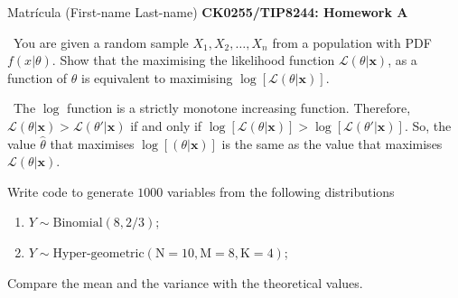 \documentclass[11pt]{article}
\newenvironment{EX}[2][Exercise]{\begin{trivlist}
\item[{\color{red} \hskip \labelsep {\bfseries #1}\hskip \labelsep {\bfseries #2.}}]}{\end{trivlist}}
\newenvironment{SL}[1][Solution]{\begin{trivlist}
\item[{\color{blue} \hskip \labelsep {\bfseries #1:}}]}{\end{trivlist}}
\begin{document}

\noindent Matr\'icula (First-name Last-name) \hfill {\Large \bfseries CK0255/TIP8244: Homework A} \\

\begin{EX}{A.1}\
You are given a random sample $X_1,X_2,\dots,X_n$ from a population with PDF $f(x|\theta)$. Show that the maximising the likelihood function $\mathcal{L}(\theta|\mathbf{x})$, as a function of $\theta$ is equivalent to maximising $\log{[\mathcal{L}(\theta|\mathbf{x})]}$.
\end{EX}

\begin{SL}\
The $\log$ function is a strictly monotone increasing function. Therefore, $\mathcal{L}(\theta|\mathbf{x}) > \mathcal{L}(\theta'|\mathbf{x})$ if and only if $\log{[\mathcal{L}(\theta|\mathbf{x})]} > \log{[\mathcal{L}(\theta'|\mathbf{x})]}$.
\vskip0.250cm
\noindent
So, the value $\hat{\theta}$ that maximises $\log{[(\theta|\mathbf{x})]}$ is the same as the value that maximises $\mathcal{L}(\theta|\mathbf{x})$.
\end{SL}


\begin{EX}{A.2}
Write code to generate $1000$ variables from the following distributions
\begin{enumerate}
\item $Y \sim \text{Binomial}(8,{2}/{3})$;
\item $Y \sim \text{Hyper-geometric}(\text{N}=10,\text{M}=8,\text{K}=4)$;\end{enumerate}
Compare the mean and the variance  with the theoretical values.
\end{EX}
\end{document}
